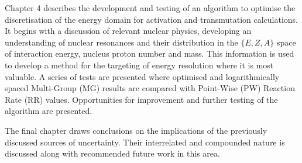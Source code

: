 Chapter 4 describes the development and testing of an algorithm to optimise the discretisation of the energy domain for activation and transmutation calculations. It begins with a discussion of relevant nuclear physics, developing an understanding of nuclear resonances and their distribution in the $\{E, Z, A\}$ space of interaction energy, nucleus proton number and mass. This information is used to develop a method for the targeting of energy resolution where it is most valuable. A series of tests are presented where optimised and logarithmically spaced Multi-Group (MG)  results are compared with Point-Wise (PW)  Reaction Rate (RR)  values. Opportunities for improvement and further testing of the algorithm are presented.

The final chapter draws conclusions on the implications of the previously discussed sources of uncertainty. Their interrelated and compounded nature is discussed along with recommended future work in this area.

